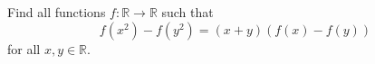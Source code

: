 \documentclass[varwidth]{standalone}
\begin{document}
    Find all functions $f: \mathbb{R} \to \mathbb{R}$ such that
    \[
        f\left(x^2\right) - f\left(y^2\right) = (x + y)(f(x) - f(y))
    \]
    for all $x, y \in \mathbb{R}$.
\end{document}
